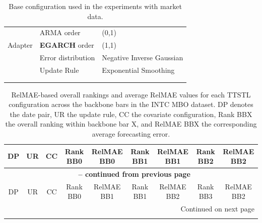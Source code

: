 \documentclass[10pt,a4paper,oneside]{article}
\begin{document}
\begin{longtable}{@{}lll@{}}
\multirow{3}{*}{Adapter} 
 & ARMA order & (0,1) \\
 & \textbf{EGARCH} order & (1,1) \\
 & Error distribution & Negative Inverse Gaussian \\ 
 & Update Rule & Exponential Smoothing \\ \midrule\\
\caption{Base configuration used in the experiments with market data.} 
\label{tab:base_config_market_data}
\end{longtable}


\begingroup
\small %
\setlength{\tabcolsep}{3pt} %
\begin{longtable}{@{}ccccccccc@{}}

\caption{RelMAE-based overall rankings and average RelMAE values for each TTSTL configuration across the backbone bars in the INTC MBO dataset. DP denotes the date pair, UR the update rule, CC the covariate configuration, Rank BBX the overall ranking within backbone bar X, and RelMAE BBX the corresponding average forecasting error.} 
\label{tab:intc_data_results} \\

\toprule
DP & UR & CC & Rank BB0 & RelMAE BB0 & Rank BB1 & RelMAE BB1 & Rank BB2 & RelMAE BB2 \\
\midrule
\endfirsthead

\multicolumn{9}{c}{{\bfseries \tablename\ \thetable{} -- continued from previous page}} \\
\toprule
DP & UR & CC & Rank BB0 & RelMAE BB1 & Rank BB1 & RelMAE BB2 & Rank BB3 & RelMAE BB2 \\
\midrule
\endhead

\midrule
\multicolumn{9}{r}{{Continued on next page}} \\
\bottomrule
\endfoot

\bottomrule
\endlastfoot


\end{longtable}
\end{document}

